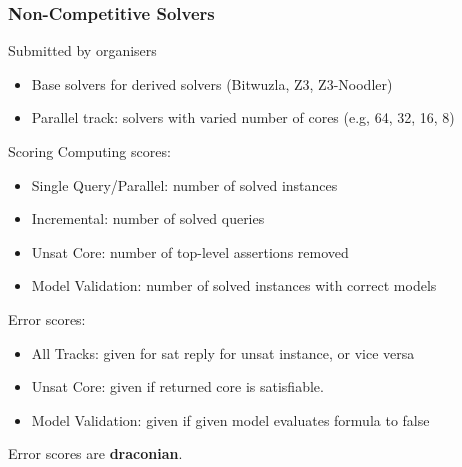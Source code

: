 \documentclass[table]{beamer}
\def\emph#1{\textcolor{MYblue}{#1}}
\begin{document}
\begin{frame}
  \frametitle{Non-Competitive Solvers}

  Submitted by organisers
  \begin{itemize}
      \item Base solvers for derived solvers (Bitwuzla, Z3, Z3-Noodler) 
      \item Parallel track: solvers with varied number of cores (e.g, 64, 32, 16, 8)       
  \end{itemize}
  \bigskip

\end{frame}

\begin{frame}{Scoring}
  Computing scores:
  \begin{itemize}
  \item \emph{Single Query/Parallel}: number of solved \emph{instances}
  \item \emph{Incremental}: number of solved \emph{queries}
  \item \emph{Unsat Core}: number of top-level assertions \emph{removed}
  \item \emph{Model Validation}: number of solved instances with correct \emph{models}
  \end{itemize}

  \bigskip
  Error scores:
  \begin{itemize}
  \item \emph{All Tracks}: given for sat reply for unsat instance, or vice versa
  \item \emph{Unsat Core}: given if returned core is satisfiable.
  \item \emph{Model Validation}: given if given model evaluates formula to \emph{false}
  \end{itemize}
  Error scores are \textbf{draconian}.
\end{frame}
\end{document}
